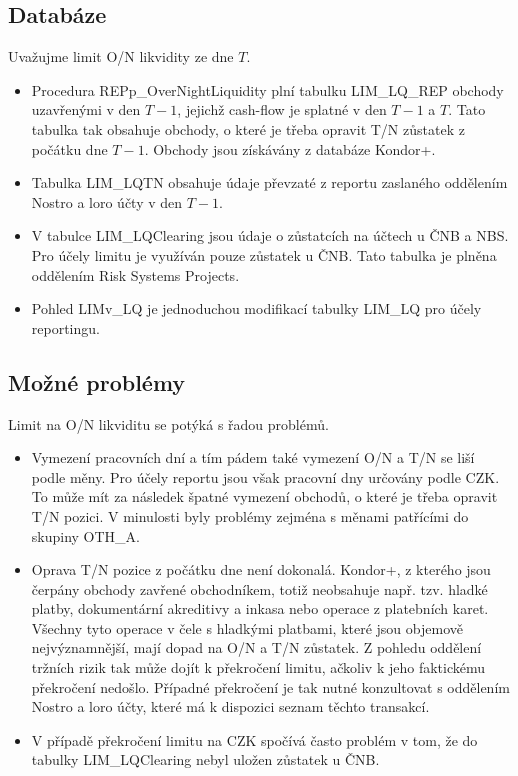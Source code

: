 \documentclass[a4paper]{book}
\begin{document}
\subsection{Databáze}

Uvažujme limit O/N likvidity ze dne $T$.
\begin{itemize}
\item Procedura REPp\_OverNightLiquidity plní tabulku LIM\_LQ\_REP obchody uzavřenými v den $T-1$, jejichž cash-flow je splatné v den $T-1$ a $T$. Tato tabulka tak obsahuje obchody, o které je třeba opravit T/N zůstatek z počátku dne $T-1$. Obchody jsou získávány z databáze Kondor+.
\item Tabulka LIM\_LQTN obsahuje údaje převzaté z reportu zaslaného oddělením Nostro a loro účty v den $T-1$.
\item V tabulce LIM\_LQClearing jsou údaje o zůstatcích na účtech u ČNB a NBS. Pro účely limitu je využíván pouze zůstatek u ČNB. Tato tabulka je plněna oddělením Risk Systems Projects.
\item Pohled LIMv\_LQ je jednoduchou modifikací tabulky LIM\_LQ pro účely reportingu.
\end{itemize}

\subsection{Možné problémy}
Limit na O/N likviditu se potýká s řadou problémů.
\begin{itemize}
\item Vymezení pracovních dní a tím pádem také vymezení O/N a T/N se liší podle měny. Pro účely reportu jsou však pracovní dny určovány podle CZK. To může mít za následek špatné vymezení obchodů, o které je třeba opravit T/N pozici. V minulosti byly problémy zejména s měnami patřícími do skupiny OTH\_A.
\item Oprava T/N pozice z počátku dne není dokonalá. Kondor+, z kterého jsou čerpány obchody zavřené obchodníkem, totiž neobsahuje např. tzv. hladké platby, dokumentární akreditivy a inkasa nebo operace z platebních karet. Všechny tyto operace v čele s hladkými platbami, které jsou objemově nejvýznamnější, mají dopad na O/N a T/N zůstatek. Z pohledu oddělení tržních rizik tak může dojít k překročení limitu, ačkoliv k jeho faktickému překročení nedošlo. Případné překročení je tak nutné konzultovat s oddělením Nostro a loro účty, které má k dispozici seznam těchto transakcí.
\item V případě překročení limitu na CZK spočívá často problém v tom, že do tabulky LIM\_LQClearing nebyl uložen zůstatek u ČNB.
\end{itemize}
\end{document}
